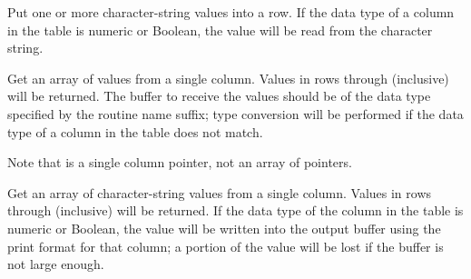 Put one or more character-string values into a row.
If the data type of a column in the table is numeric or Boolean, the
value will be read from the character string.

\callseqtable

\begin{callseq}
\end{callseq}

Get an array of values from a single column.  Values in rows 
through  (inclusive) will be returned.
The buffer to receive the values should be of
the data type specified by the routine name suffix; type conversion will be
performed if the data type of a column in the table does not match.

\callseqtable

Note that  is a single column pointer,
not an array of pointers.

\begin{callseq}
\end{callseq}

Get an array of character-string values from a single column.
Values in rows 
through  (inclusive) will be returned.
If the data type of the column in the table is numeric or Boolean, the value
will be written into the output buffer using the print format for that column;
a portion of the value will be lost if the buffer is not large enough.


